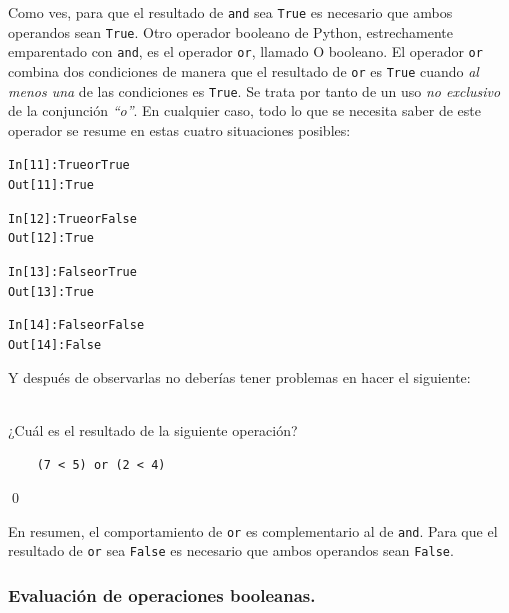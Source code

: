 \documentclass[10pt,a4paper]{article}\usepackage[]{graphicx}\usepackage[]{color}
\makeatletter
\newenvironment{kframe}{%
 \def\at@end@of@kframe{}%
 \ifinner\ifhmode%
  \def\at@end@of@kframe{\end{minipage}}%
  \begin{minipage}{\columnwidth}%
 \fi\fi%
 \def\FrameCommand##1{\hskip\@totalleftmargin \hskip-\fboxsep
 \colorbox{shadecolor}{##1}\hskip-\fboxsep
     \hskip-\linewidth \hskip-\@totalleftmargin \hskip\columnwidth}%
 \MakeFramed {\advance\hsize-\width
   \@totalleftmargin\z@ \linewidth\hsize
   \@setminipage}}%
 {\par\unskip\endMakeFramed%
 \at@end@of@kframe}
\newenvironment{knitrout}{}{} %
\makeatother
\begin{document}
Como ves, para que el resultado de {\tt and} sea {\tt True} es necesario que ambos operandos sean {\tt True}. Otro operador booleano de Python, estrechamente emparentado con {\tt and}, es el operador {\tt or}, llamado {\sf O booleano}. El operador {\tt or} combina dos condiciones de manera que el resultado de {\tt or} es {\tt True} cuando {\em al menos una} de las condiciones es {\tt True}. Se trata por tanto de un uso {\em no exclusivo} de la conjunción {\em ``o''}.  En cualquier caso, todo lo que se necesita saber de este operador se resume en estas cuatro situaciones posibles:
\begin{knitrout}
\color{fgcolor}\begin{kframe}
\begin{alltt}
In [11]: True or True
Out[11]: True

In [12]: True or False
Out[12]: True

In [13]: False or True
Out[13]: True

In [14]: False or False
Out[14]: False
\end{alltt}
\end{kframe}
\end{knitrout}
Y después de observarlas  no deberías tener problemas en hacer el siguiente:
\begin{ejercicio}
\label{tut02:ejercicio31}
\quad\\
¿Cuál es el resultado de la siguiente operación?
\begin{verbatim}
    (7 < 5) or (2 < 4)
\end{verbatim}
\qed
\end{ejercicio}
En resumen,  el comportamiento de {\tt or} es complementario al de {\tt and}. Para que el resultado de {\tt or} sea {\tt False} es necesario que ambos operandos sean {\tt False}.

\subsubsection*{Evaluación de operaciones booleanas.}
\label{tut02:subsubsec:evaluacionOperacionesBooleanas}
\\
\end{document}
